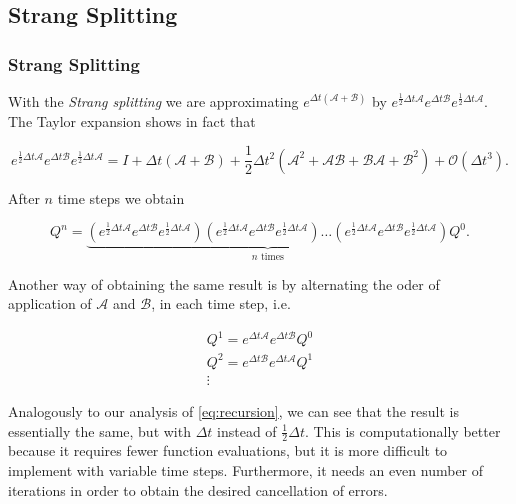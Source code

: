 \documentclass{beamer}
\newcommand{\ca}{\mathcal{A}}
\newcommand{\cb}{\mathcal{B}}
\renewcommand{\d}{\Delta}
\begin{document}
\subsection{Strang Splitting}
\begin{frame}
	\frametitle{Strang Splitting}
	With the \textit{Strang splitting} we are approximating $e^{\d t(\ca +\cb)}$ by $e^{\frac{1}{2}\d t\ca}e^{\d t\cb}e^{\frac{1}{2}\d t\ca}$. The Taylor expansion shows in fact that

	\begin{equation}
		e^{\frac{1}{2}\d t\ca}e^{\d t\cb}e^{\frac{1}{2}\d t\ca} = I+\d t(\ca + \cb)+\frac{1}{2}\d t^2(\ca^2+\ca\cb+\cb\ca+\cb^2)+\mathcal{O}(\d t^3).
	\end{equation}

	After $n$ time steps we obtain

	\begin{equation}\label{eq:recursion}
		Q^n = \underbrace{(e^{\frac{1}{2}\d t\ca}e^{\d t\cb}e^{\frac{1}{2}\d t\ca})(e^{\frac{1}{2}\d t\ca}e^{\d t\cb}e^{\frac{1}{2}\d t\ca})\dots(e^{\frac{1}{2}\d t\ca}e^{\d t\cb}e^{\frac{1}{2}\d t\ca})}_{n\text{ times}}Q^0.
	\end{equation}

	Another way of obtaining the same result is by alternating the oder of application of $\ca$ and $\cb$, in each time step, i.e.

	\begin{equation}
		\begin{gathered}
			Q^1 = e^{\d t\ca}e^{\d t\cb}Q^0\\
			Q^2 = e^{\d t\cb}e^{\d t\ca}Q^1\\
			\vdots
		\end{gathered}
	\end{equation}

	Analogously to our analysis of \eqref{eq:recursion}, we can see that the result is essentially the same, but with $\d t$ instead of $\frac{1}{2}\d t$. This is computationally better because it requires fewer function evaluations, but it is more difficult to implement with variable time steps. Furthermore, it needs an even number of iterations in order to obtain the desired cancellation of errors.
\end{frame}
\end{document}
